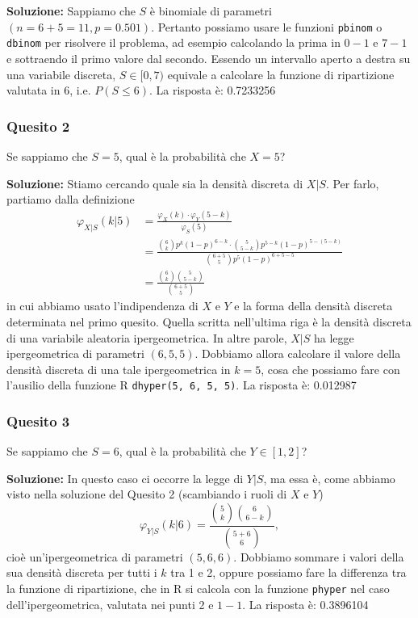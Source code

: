 \documentclass[12pt, a4paper]{article}
\begin{document}
\textbf{Soluzione:}
Sappiamo che $S$ è binomiale di parametri $(n=6+5=11, p=0.501)$.
Pertanto possiamo usare le funzioni \texttt{pbinom} o \texttt{dbinom} per risolvere il problema, ad esempio calcolando la prima in $0-1$ e $7-1$ e sottraendo il primo valore dal secondo. Essendo un intervallo aperto a destra su una variabile discreta, $S \in [0,7)$ equivale a calcolare la funzione di ripartizione valutata in 6, i.e. $P(S \leq 6)$.
La risposta è: 0.7233256

\subsubsection*{Quesito 2}
Se sappiamo che $S=5$, qual è la probabilità che $X=5$?

\textbf{Soluzione:}
Stiamo cercando quale sia la densità discreta di $X|S$. Per farlo, partiamo dalla definizione
$$ \begin{aligned} \varphi_{X|S}(k|5) &= \frac{\varphi_X(k) \cdot \varphi_Y(5-k)}{\varphi_S(5)} \\ &= \frac{\binom{6}{k}p^k(1-p)^{6-k} \cdot \binom{5}{5-k}p^{5-k}(1-p)^{5-(5-k)}}{\binom{6+5}{5}p^5(1-p)^{6+5-5}} \\ &= \frac{\binom{6}{k}\binom{5}{5-k}}{\binom{6+5}{5}} \end{aligned} $$
in cui abbiamo usato l’indipendenza di $X$ e $Y$ e la forma della densità discreta determinata nel primo quesito.
Quella scritta nell’ultima riga è la densità discreta di una variabile aleatoria ipergeometrica. In altre parole, $X|S$ ha legge ipergeometrica di parametri $(6, 5, 5)$. Dobbiamo allora calcolare il valore della densità discreta di una tale ipergeometrica in $k=5$, cosa che possiamo fare con l’ausilio della funzione R \texttt{dhyper(5, 6, 5, 5)}.
La risposta è: 0.012987

\newpage

\subsubsection*{Quesito 3}
Se sappiamo che $S=6$, qual è la probabilità che $Y \in [1,2]$?

\textbf{Soluzione:}
In questo caso ci occorre la legge di $Y|S$, ma essa è, come abbiamo visto nella soluzione del Quesito 2 (scambiando i ruoli di $X$ e $Y$)
$$ \varphi_{Y|S}(k|6) = \frac{\binom{5}{k}\binom{6}{6-k}}{\binom{5+6}{6}}, $$
cioè un’ipergeometrica di parametri $(5, 6, 6)$. Dobbiamo sommare i valori della sua densità discreta per tutti i $k$ tra 1 e 2, oppure possiamo fare la differenza tra la funzione di ripartizione, che in R si calcola con la funzione \texttt{phyper} nel caso dell’ipergeometrica, valutata nei punti 2 e $1-1$.
La risposta è: 0.3896104
\end{document}
